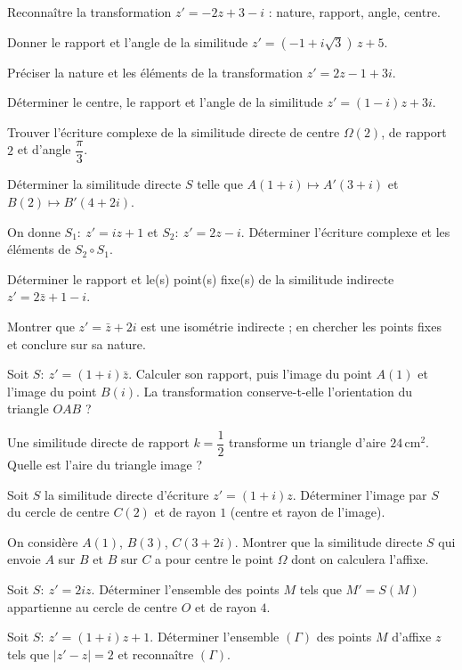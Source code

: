 \exo{} Reconnaître la transformation $z'=-2z+3-i$ : nature, rapport, angle, centre.

\exo{} Donner le rapport et l'angle de la similitude $z'=(-1+i\sqrt3)\,z+5$.

\exo{} Préciser la nature et les éléments de la transformation $z'=2z-1+3i$.

\exo{} Déterminer le centre, le rapport et l'angle de la similitude $z'=(1-i)z+3i$.

\exo{} Trouver l'écriture complexe de la similitude directe de centre $\Omega(2)$, de rapport $2$ et d'angle $\dfrac\pi3$.

\exo{} Déterminer la similitude directe $S$ telle que $A(1+i)\mapsto A'(3+i)$ et $B(2)\mapsto B'(4+2i)$.

\exo{} On donne $S_1:\ z'=iz+1$ et $S_2:\ z'=2z-i$. Déterminer l'écriture complexe et les éléments de $S_2\circ S_1$.

\exo{} Déterminer le rapport et le(s) point(s) fixe(s) de la similitude indirecte $z'=2\bar z+1-i$.

\exo{} Montrer que $z'=\bar z+2i$ est une isométrie indirecte ; en chercher les points fixes et conclure sur sa nature.

\exo{} Soit $S:\ z'=(1+i)\bar z$. Calculer son rapport, puis l'image du point $A(1)$ et l'image
du point $B(i)$. La transformation conserve-t-elle l'orientation du triangle $OAB$ ?

\exo{} Une similitude directe de rapport $k=\dfrac12$ transforme un triangle d'aire $24\,\text{cm}^2$.
Quelle est l'aire du triangle image ?

\exo{} Soit $S$ la similitude directe d'écriture $z'=(1+i)z$. Déterminer l'image par $S$ du cercle de
centre $C(2)$ et de rayon $1$ (centre et rayon de l'image).

\exo{} On considère $A(1)$, $B(3)$, $C(3+2i)$. Montrer que la similitude directe $S$ qui envoie $A$ sur $B$ et
$B$ sur $C$ a pour centre le point $\Omega$ dont on calculera l'affixe.

\exo{} Soit $S:\ z'=2iz$. Déterminer l'ensemble des points $M$ tels que $M'=S(M)$ appartienne au cercle de centre $O$ et de rayon $4$.

\exo{} Soit $S:\ z'=(1+i)z+1$. Déterminer l'ensemble $(\Gamma)$ des points $M$ d'affixe $z$ tels que
$|z'-z|=2$ et reconnaître $(\Gamma)$.

